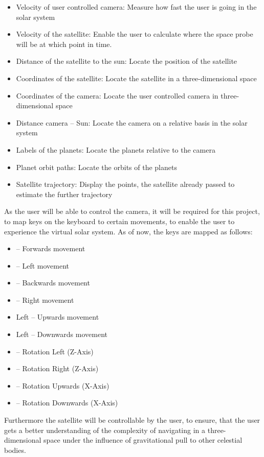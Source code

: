 \documentclass[conference,compsoc]{IEEEtran}
\begin{document}
\begin{itemize}
	\item Velocity of user controlled camera: Measure how fast the user is going in the solar system
	\item Velocity of the satellite: Enable the user to calculate where the space probe will be at which point in time.
	\item Distance of the satellite to the sun: Locate the position of the satellite
	\item Coordinates of the satellite: Locate the satellite in a three-dimensional space
	\item Coordinates of the camera: Locate the user controlled camera in three-dimensional space
	\item Distance camera – Sun: Locate the camera on a relative basis in the solar system
	\item Labels of the planets: Locate the planets relative to the camera
	\item Planet orbit paths: Locate the orbits of the planets
	\item Satellite trajectory: Display the points, the satellite already passed to estimate the further trajectory
\end{itemize}
As the user will be able to control the camera, it will be required for this project, to map keys on the keyboard to certain movements, to enable the user to experience the virtual solar system. As of now, the keys are mapped as follows:
\begin{itemize}
	\item {} – Forwards movement
	\item {} – Left movement
	\item {} – Backwards movement
	\item {} – Right movement
	\item Left \keys{\shift} – Upwards movement
	\item Left \keys{\ctrl} – Downwards movement
	\item \keys{\arrowkeyleft} – Rotation Left (Z-Axis)
	\item \keys{\arrowkeyright} – Rotation Right (Z-Axis)
	\item \keys{\arrowkeyup} – Rotation Upwards (X-Axis)
	\item \keys{\arrowkeydown} – Rotation Downwards (X-Axis)
\end{itemize}
Furthermore the  satellite will be controllable by the user, to ensure, that the user gets a better understanding of the complexity of navigating in a three-dimensional space under the influence of gravitational pull to other celestial bodies. 
\end{document}

